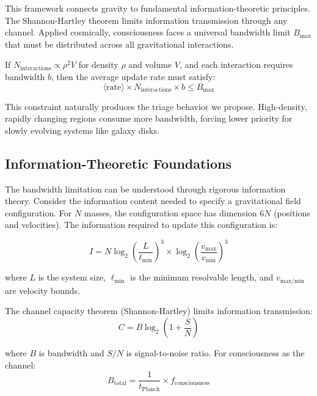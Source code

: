 \documentclass[twocolumn,prd,amsmath,amssymb,aps,superscriptaddress,nofootinbib]{revtex4-2}
\begin{document}
This framework connects gravity to fundamental information-theoretic principles. The Shannon-Hartley theorem limits information transmission through any channel. Applied cosmically, consciousness faces a universal bandwidth limit $B_{\text{max}}$ that must be distributed across all gravitational interactions.

If $N_{\text{interactions}} \propto \rho^2 V$ for density $\rho$ and volume $V$, and each interaction requires bandwidth $b$, then the average update rate must satisfy:
\begin{equation}
\langle \text{rate} \rangle \times N_{\text{interactions}} \times b \leq B_{\text{max}}
\end{equation}

This constraint naturally produces the triage behavior we propose. High-density, rapidly changing regions consume more bandwidth, forcing lower priority for slowly evolving systems like galaxy disks.

\subsection{Information-Theoretic Foundations}

The bandwidth limitation can be understood through rigorous information theory. Consider the information content needed to specify a gravitational field configuration. For $N$ masses, the configuration space has dimension $6N$ (positions and velocities). The information required to update this configuration is:

\begin{equation}
I = N \log_2\left(\frac{L}{\ell_{\text{min}}}\right)^3 \times \log_2\left(\frac{v_{\text{max}}}{v_{\text{min}}}\right)^3
\end{equation}

where $L$ is the system size, $\ell_{\text{min}}$ is the minimum resolvable length, and $v_{\text{max/min}}$ are velocity bounds.

The channel capacity theorem (Shannon-Hartley) limits information transmission:
\begin{equation}
C = B \log_2\left(1 + \frac{S}{N}\right)
\end{equation}

where $B$ is bandwidth and $S/N$ is signal-to-noise ratio. For consciousness as the channel:
\begin{equation}
B_{\text{total}} = \frac{1}{t_{\text{Planck}}} \times f_{\text{consciousness}}
\end{equation}
\end{document}
